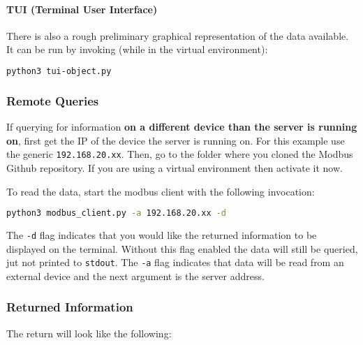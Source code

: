 \documentclass[10pt,]{article}
\newcommand{\passthrough}[1]{#1}
\begin{document}
\hypertarget{tui-terminal-user-interface}{%
\paragraph{TUI (Terminal User
Interface)}\label{tui-terminal-user-interface}}

There is also a rough preliminary graphical representation of the data
available. It can be run by invoking (while in the virtual environment):

\begin{lstlisting}[language=bash]
python3 tui-object.py
\end{lstlisting}

\hypertarget{remote-queries}{%
\subsubsection{Remote Queries}\label{remote-queries}}

If querying for information \textbf{on a different device than the
server is running on}, first get the IP of the device the server is
running on. For this example use the generic
\passthrough{\lstinline!192.168.20.xx!}. Then, go to the folder where
you cloned the Modbus Github repository. If you are using a virtual
environment then activate it now.

To read the data, start the modbus client with the following invocation:

\begin{lstlisting}[language=bash]
python3 modbus_client.py -a 192.168.20.xx -d
\end{lstlisting}

The \passthrough{\lstinline!-d!} flag indicates that you would like the
returned information to be displayed on the terminal. Without this flag
enabled the data will still be queried, jut not printed to
\passthrough{\lstinline!stdout!}. The \passthrough{\lstinline!-a!} flag
indicates that data will be read from an external device and the next
argument is the server address.

\hypertarget{returned-information}{%
\subsubsection{Returned Information}\label{returned-information}}

The return will look like the following:
\end{document}
